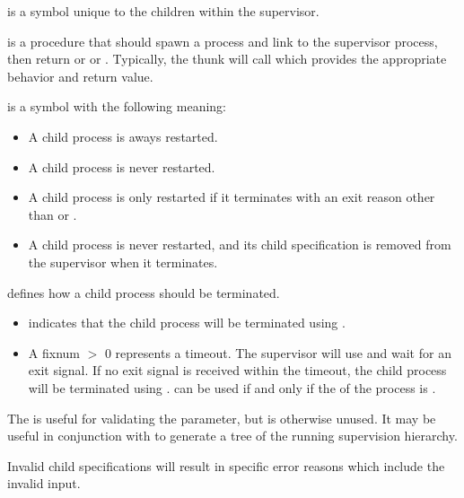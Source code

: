  is a symbol unique to the children within the supervisor.

 is a procedure that should spawn a process and link to the
supervisor process, then return  or
 or . Typically, the
thunk will call  which provides the
appropriate behavior and return value.

 is a symbol with the following meaning:
\antipar
\begin{itemize}
  \item A  child process is aways restarted.
  \item A  child process is never restarted.
  \item A  child process is only restarted if it
    terminates with an exit reason other than  or
    .
  \item A  child process is never restarted, and
    its child specification is removed from the supervisor when it
    terminates.
\end{itemize}

 defines how a child process should be terminated.
\antipar
\begin{itemize}
\item {} indicates that the child process will be
  terminated using .

\item A fixnum $>$ 0 represents a timeout. The supervisor will use
   and wait for an exit signal. If
  no exit signal is received within the timeout, the child process
  will be terminated using .  can be used if and only if the
   of the process is .
\end{itemize}

The  is useful for validating the  parameter,
but is otherwise unused. It may be useful in conjunction with
 to generate a tree of the running
supervision hierarchy.

\begin{grammar}
\end{grammar}

Invalid child specifications will result in specific error reasons
which include the invalid input.

